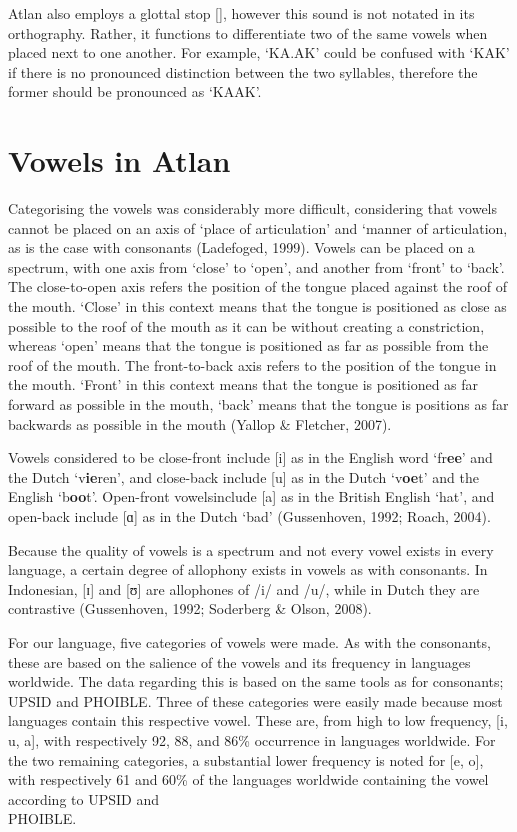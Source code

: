 Atlan also employs a glottal stop [\textglotstop], however this sound is not notated in its orthography. Rather, it functions to differentiate two of the same vowels when placed next to one another. For example, ‘KA.AK’ could be confused with ‘KAK’ if there is no pronounced distinction between the two syllables, therefore the former should be pronounced as ‘KA\textglotstop AK’. 


\section{Vowels in Atlan}

Categorising the vowels was considerably more difficult, considering that vowels cannot be placed on an axis of ‘place of articulation’ and ‘manner of articulation, as is the case with consonants (Ladefoged, 1999). Vowels can be placed on a spectrum, with one axis from ‘close’ to ‘open’, and another from ‘front’ to ‘back’. The close-to-open axis refers the position of the tongue placed against the roof of the mouth. ‘Close’ in this context means that the tongue is positioned as close as possible to the roof of the mouth as it can be without creating a constriction, whereas ‘open’ means that the tongue is positioned as far as possible from the roof of the mouth. The front-to-back axis refers to the position of the tongue in the mouth. ‘Front’ in this context means that the tongue is positioned as far forward as possible in the mouth, ‘back’ means that the tongue is positions as far backwards as possible in the mouth (Yallop \& Fletcher, 2007). 

Vowels considered to be close-front include [i] as in the English word ‘fr{\bf ee}’ and the Dutch ‘v{\bf ie}ren’, and close-back include [u] as in the Dutch ‘v{\bf oe}t’ and the English ‘b{\bf oo}t’. Open-front vowelsinclude [a] as in the British English ‘hat’, and open-back include [ɑ] as in the Dutch ‘bad’ (Gussenhoven, 1992; Roach, 2004). 

Because the quality of vowels is a spectrum and not every vowel exists in every language, a certain degree of allophony exists in vowels as with consonants. In Indonesian, [ɪ] and [ʊ] are allophones of /i/ and /u/, while in Dutch they are contrastive (Gussenhoven, 1992; Soderberg \& Olson, 2008). 

For our language, five categories of vowels were made. As with the consonants, these are based on the salience of the vowels and its frequency in languages worldwide. The data regarding this is based on the same tools as for consonants; UPSID and PHOIBLE. Three of these categories were easily made because most languages contain this respective vowel. These are, from high to low frequency, [i, u, a], with respectively 92, 88, and 86\% occurrence in languages worldwide. For the two remaining categories, a substantial lower frequency is noted for [e, o], with respectively 61 and 60\% of the languages worldwide containing the vowel according to UPSID and \\ PHOIBLE. 

